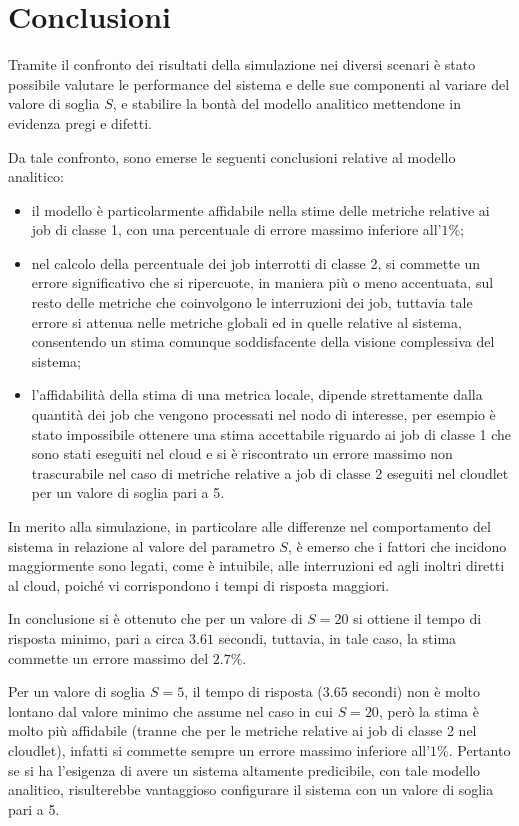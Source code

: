 \section{Conclusioni}
Tramite il confronto dei risultati della simulazione nei diversi scenari è stato
possibile valutare le performance del sistema e delle sue componenti al variare
del valore di soglia $S$, e stabilire la bontà del modello analitico mettendone
in evidenza pregi e difetti.

Da tale confronto, sono emerse le seguenti conclusioni relative al modello
analitico:
\begin{itemize}
\item il modello è particolarmente affidabile nella stime delle metriche
relative ai job di classe 1, con una percentuale di errore massimo inferiore
all'$1\%$;
\item nel calcolo della percentuale dei job interrotti di classe 2, si commette
un errore significativo che si ripercuote, in maniera più o meno accentuata, sul
resto delle metriche che coinvolgono le interruzioni dei job, tuttavia tale
errore si attenua nelle metriche globali ed in quelle relative al sistema,
consentendo un stima comunque soddisfacente della visione complessiva del
sistema;
\item l'affidabilità della stima di una metrica locale, dipende strettamente
dalla quantità dei job che vengono processati nel nodo di interesse, per esempio
è stato impossibile ottenere una stima accettabile riguardo ai job di classe 1
che sono stati eseguiti nel cloud e si è riscontrato un errore massimo non
trascurabile nel caso di metriche relative a job di classe 2 eseguiti nel
cloudlet per un valore di soglia pari a 5.
\end{itemize}

In merito alla simulazione, in particolare alle differenze nel comportamento del
sistema in relazione al valore del parametro $S$, è emerso che i fattori che
incidono maggiormente sono legati, come è intuibile, alle interruzioni ed agli
inoltri diretti al cloud, poiché vi corrispondono i tempi di risposta maggiori.

In conclusione si è ottenuto che per un valore di $S=20$ si ottiene il
tempo di risposta minimo, pari a circa $3.61$ secondi, tuttavia, in tale caso,
la stima commette un errore massimo del $2.7\%$. 

Per un valore di soglia $S=5$, il tempo di risposta ($3.65$ secondi) non è molto
lontano dal valore minimo che assume nel caso in cui $S=20$, però la stima è
molto più affidabile (tranne che per le metriche relative ai job di classe 2 nel
cloudlet), infatti si commette sempre un errore massimo inferiore all'$1\%$.
Pertanto se si ha l'esigenza di avere un sistema altamente predicibile, con tale
modello analitico, risulterebbe vantaggioso configurare il sistema con un valore
di soglia pari a 5.
